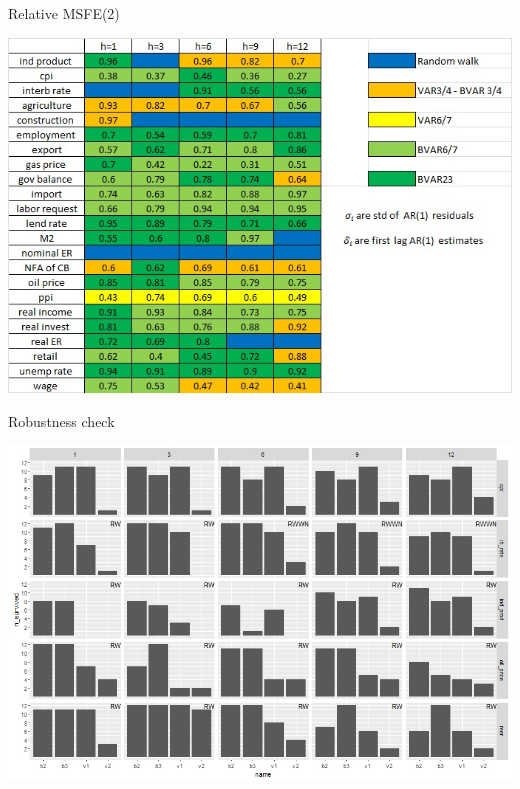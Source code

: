 \documentclass{beamer} %
\begin{document}
\begin{frame}{Relative MSFE(2)} %
\vspace{-5mm}
\begin{center}
\includegraphics[scale=0.60]{hyper4.jpg}
\end{center}
\end{frame}

\begin{frame}{Robustness check}
\begin{adjustwidth}{-1.5em}{-1.5em}
\vspace{-5mm}
\includegraphics[scale=0.42]{model_selection.jpeg}
\end{adjustwidth}
\end{frame}
\end{document}
